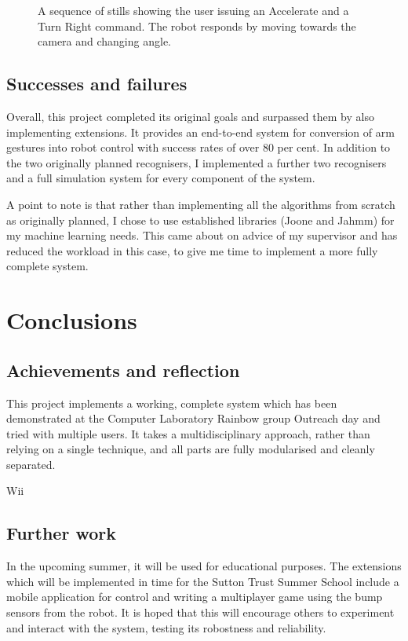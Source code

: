 \documentclass[12pt,a4,notitlepage]{report}
\renewcommand{\_}{\texttt{\symbol{95}}}
\newcommand{\<}{\texttt{\symbol{60}}}
\renewcommand{\>}{\texttt{\symbol{62}}}
\begin{document}
\begin{figure}
\caption{A sequence of stills showing the user issuing an Accelerate and a Turn Right command. The robot responds by moving towards the camera and changing angle.}
\label{driving}
\end{figure}
\section{Successes and failures}

Overall, this project completed its original goals and surpassed them by also implementing extensions. It provides an end-to-end system for conversion of arm gestures into robot control with success rates of over 80 per cent. In addition to the two originally planned recognisers, I implemented a further two recognisers and a full simulation system for every component of the system.

A point to note is that rather than implementing all the algorithms from scratch as originally planned, I chose to use established libraries (Joone and Jahmm) for my machine learning needs. This came about on advice of my supervisor and has reduced the workload in this case, to give me time to implement a more fully complete system.

\chapter{Conclusions}

\section{Achievements and reflection}

This project implements a working, complete system which has been demonstrated at the Computer Laboratory Rainbow group Outreach day and tried with multiple users. It takes a multidisciplinary approach, rather than relying on a single technique, and all parts are fully modularised and cleanly separated.

Wii

\section{Further work}

In the upcoming summer, it will be used for educational purposes. The extensions which will be implemented in time for the Sutton Trust Summer School include a mobile application for control and writing a multiplayer game using the bump sensors from the robot. It is hoped that this will encourage others to experiment and interact with the system, testing its robostness and reliability.
\end{document}
